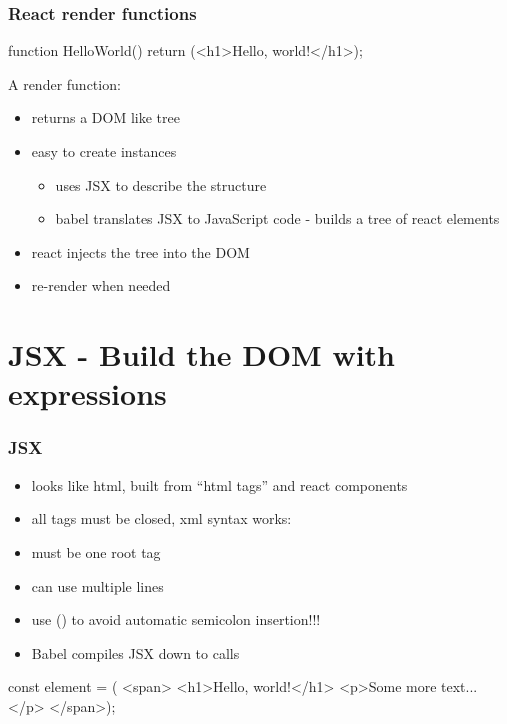 \begin{frame}[fragile] \frametitle{React render functions}
\begin{CodeBox}{}
function HelloWorld() {
  return (<h1>Hello, world!</h1>);
}
\end{CodeBox}

\vspace{8mm}
A render function:
\begin{itemize}
  \item returns a DOM like tree
  \item easy to create instances
  \begin{itemize}
    \item uses JSX to describe the structure
    \item babel translates JSX to JavaScript code - builds a tree of react elements
  \end{itemize}
  \item react injects the tree into the DOM
  \item re-render when needed
\end{itemize}

\end{frame}

\section{JSX - Build the DOM with expressions}
\begin{frame}[fragile] \frametitle{JSX}
\begin{itemize}
  \item looks like html, built from ``html tags'' and react components
  \item all tags must be closed, xml syntax works: 
  \item must be one root tag
  \item can use multiple lines
  \item use () to avoid automatic semicolon insertion!!!
  \item Babel compiles JSX down to  calls
\end{itemize}

\begin{CodeBox}{}
const element = (
<span>
  <h1>Hello, world!</h1>
  <p>Some more text...</p>
</span>);
\end{CodeBox}
\end{frame}

